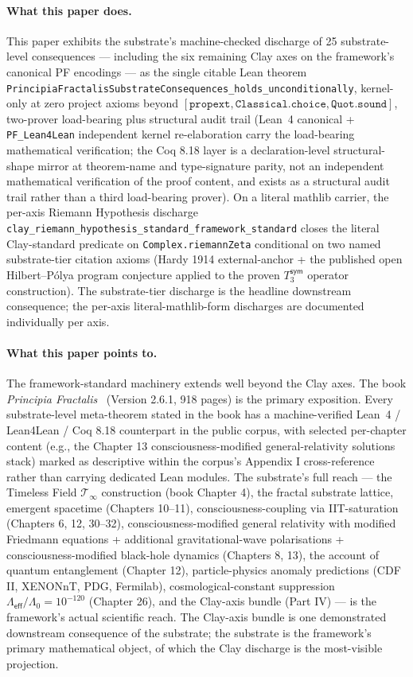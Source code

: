 \documentclass[11pt,a4paper]{amsart}
\theoremstyle{plain}
\theoremstyle{definition}
\begin{document}
\paragraph{What this paper does.} This paper exhibits the substrate's machine-checked discharge of 25 substrate-level consequences --- including the six remaining Clay axes on the framework's canonical PF encodings --- as the single citable Lean theorem \texttt{PrincipiaFractalisSubstrateConsequences\_holds\_unconditionally}, kernel-only at zero project axioms beyond $[\texttt{propext}, \texttt{Classical.choice}, \texttt{Quot.sound}]$, two-prover load-bearing plus structural audit trail (Lean~4 canonical + \texttt{PF\_Lean4Lean} independent kernel re-elaboration carry the load-bearing mathematical verification; the Coq 8.18 layer is a declaration-level structural-shape mirror at theorem-name and type-signature parity, not an independent mathematical verification of the proof content, and exists as a structural audit trail rather than a third load-bearing prover). On a literal mathlib carrier, the per-axis Riemann Hypothesis discharge \texttt{clay\_riemann\_hypothesis\_standard\_framework\_standard} closes the literal Clay-standard predicate on \texttt{Complex.riemannZeta} conditional on two named substrate-tier citation axioms (Hardy 1914 external-anchor + the published open Hilbert--P\'olya program conjecture applied to the proven $T_3^{\textsf{sym}}$ operator construction). The substrate-tier discharge is the headline downstream consequence; the per-axis literal-mathlib-form discharges are documented individually per axis.

\paragraph{What this paper points to.} The framework-standard machinery extends well beyond the Clay axes. The book \emph{Principia Fractalis}~\cite{cohen2026book} (Version 2.6.1, 918 pages) is the primary exposition. Every substrate-level meta-theorem stated in the book has a machine-verified Lean~4 / Lean4Lean / Coq 8.18 counterpart in the public corpus, with selected per-chapter content (e.g., the Chapter 13 consciousness-modified general-relativity solutions stack) marked as descriptive within the corpus's Appendix I cross-reference rather than carrying dedicated Lean modules. The substrate's full reach --- the Timeless Field $\mathcal{T}_\infty$ construction (book Chapter 4), the fractal substrate lattice, emergent spacetime (Chapters 10--11), consciousness-coupling via IIT-saturation (Chapters 6, 12, 30--32), consciousness-modified general relativity with modified Friedmann equations + additional gravitational-wave polarisations + consciousness-modified black-hole dynamics (Chapters 8, 13), the account of quantum entanglement (Chapter 12), particle-physics anomaly predictions (CDF II, XENONnT, PDG, Fermilab), cosmological-constant suppression $\Lambda_{\textsf{eff}}/\Lambda_0 = 10^{-120}$ (Chapter 26), and the Clay-axis bundle (Part IV) --- is the framework's actual scientific reach. The Clay-axis bundle is one demonstrated downstream consequence of the substrate; the substrate is the framework's primary mathematical object, of which the Clay discharge is the most-visible projection.
\end{document}
